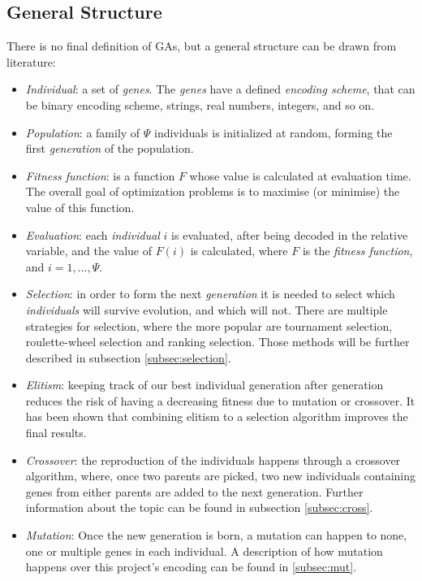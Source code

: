 \subsection{General Structure}
There is no final definition of GAs, but a general structure can be drawn from literature:
\begin{itemize}
\item \emph{Individual}: a set of \emph{genes}. The \emph{genes} have a defined \emph{encoding scheme}, that can be binary encoding scheme, strings, real numbers, integers, and so on. 
\item \emph{Population}: a family of $\Psi$ individuals is initialized at random, forming the first \emph{generation} of the population.
\item \emph{Fitness function}: is a function $F$ whose value is calculated at evaluation time. The overall goal of optimization problems is to maximise (or minimise) the value of this function.
\item \emph{Evaluation}: each \emph{individual} $i$ is evaluated, after being decoded in the relative variable, and the value of $F(i)$ is calculated, where $F$ is the \emph{fitness function}, and $i=1,...,\Psi$.
\item \emph{Selection}: in order to form the next \emph{generation} it is needed to select which \emph{individuals} will survive evolution, and which will not. There are multiple strategies for selection, where the more popular are tournament selection, roulette-wheel selection and ranking selection. Those methods will be further described in subsection \ref{subsec:selection}.
\item \emph{Elitism}: keeping track of our best individual generation after generation reduces the risk of having a decreasing fitness due to mutation or crossover. It has been shown that combining elitism to a selection algorithm improves the final results\cite{baluja1995removing}.
\item \emph{Crossover}: the reproduction of the individuals happens through a crossover algorithm, where, once two parents are picked, two new individuals containing genes from either parents are added to the next generation. Further information about the topic can be found in subsection \ref{subsec:cross}.
\item \emph{Mutation}: Once the new generation is born, a mutation can happen to none, one or multiple genes in each individual. A description of how mutation happens over this project's encoding can be found in \ref{subsec:mut}.
\end{itemize}
